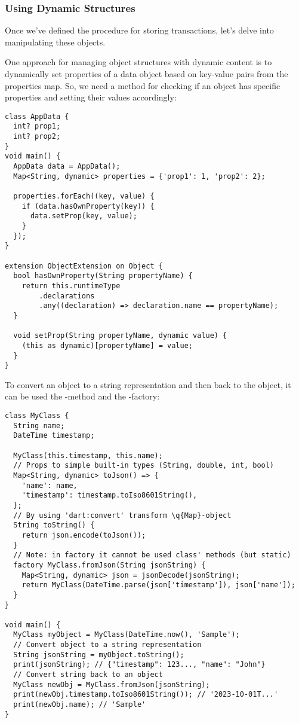 \subsubsection{Using Dynamic Structures}

Once we've defined the procedure for storing transactions, let's delve into manipulating these objects. 

One approach for managing object structures with dynamic content is to dynamically set properties of a data object 
based on key-value pairs from the properties map. So, we need a method for checking if an object has specific 
properties and setting their values accordingly:

\begin{lstlisting}
class AppData {
  int? prop1;
  int? prop2;
}
void main() {
  AppData data = AppData();
  Map<String, dynamic> properties = {'prop1': 1, 'prop2': 2};

  properties.forEach((key, value) {
    if (data.hasOwnProperty(key)) {
      data.setProp(key, value);
    }
  });
}

extension ObjectExtension on Object {
  bool hasOwnProperty(String propertyName) {
    return this.runtimeType
        .declarations
        .any((declaration) => declaration.name == propertyName);
  }

  void setProp(String propertyName, dynamic value) {
    (this as dynamic)[propertyName] = value;
  }
}
\end{lstlisting}

\noindent To convert an object to a string representation and then back to the object, it can be used the 
-method and the -factory: 

\begin{lstlisting}
class MyClass {
  String name;
  DateTime timestamp;

  MyClass(this.timestamp, this.name);
  // Props to simple built-in types (String, double, int, bool)
  Map<String, dynamic> toJson() => {
    'name': name,
    'timestamp': timestamp.toIso8601String(),
  };
  // By using 'dart:convert' transform \q{Map}-object
  String toString() {
    return json.encode(toJson());
  }
  // Note: in factory it cannot be used class' methods (but static)
  factory MyClass.fromJson(String jsonString) {
    Map<String, dynamic> json = jsonDecode(jsonString);
    return MyClass(DateTime.parse(json['timestamp']), json['name']);
  }
}

void main() {
  MyClass myObject = MyClass(DateTime.now(), 'Sample');
  // Convert object to a string representation
  String jsonString = myObject.toString();
  print(jsonString); // {"timestamp": 123..., "name": "John"}
  // Convert string back to an object
  MyClass newObj = MyClass.fromJson(jsonString);
  print(newObj.timestamp.toIso8601String()); // '2023-10-01T...'
  print(newObj.name); // 'Sample'
}
\end{lstlisting}

